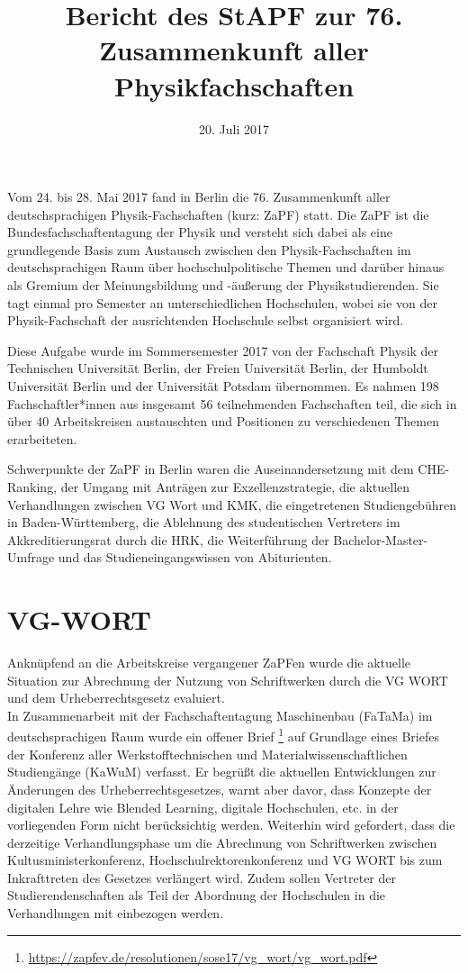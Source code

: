 \documentclass[a4paper]{article}
\begin{document}
	
\title{Bericht des StAPF zur 76. Zusammenkunft aller Physikfachschaften}
\date{20. Juli 2017}

\maketitle

Vom 24. bis 28. Mai 2017 fand in Berlin die 76. Zusammenkunft
aller deutschsprachigen Physik-Fachschaften (kurz: ZaPF) statt.  Die ZaPF ist
die Bundesfachschaftentagung der Physik und versteht sich dabei als eine
grundlegende Basis zum Austausch zwischen den Physik-Fachschaften im
deutschsprachigen Raum über hochschulpolitische Themen und darüber hinaus als
Gremium der Meinungsbildung und -äußerung der Physikstudierenden. Sie tagt
einmal pro Semester an unterschiedlichen Hochschulen, wobei sie von der
Physik-Fachschaft der ausrichtenden Hochschule selbst organisiert wird. 

Diese Aufgabe wurde im Sommersemester 2017 von der Fachschaft Physik der
Technischen Universität Berlin, der Freien Universität Berlin, der Humboldt
Universität Berlin und der Universität Potsdam übernommen.  Es nahmen 198
Fachschaftler*innen aus insgesamt 56 teilnehmenden Fachschaften teil, die sich
in über 40 Arbeitskreisen austauschten und Positionen zu verschiedenen Themen
erarbeiteten.

Schwerpunkte der ZaPF in Berlin waren die Auseinandersetzung mit dem
CHE-Ranking, der Umgang mit Anträgen zur Exzellenzstrategie, die aktuellen
Verhandlungen zwischen VG Wort und KMK, die eingetretenen Studiengebühren in
Baden-Württemberg, die Ablehnung des studentischen Vertreters im
Akkreditierungsrat durch die HRK, die Weiterführung der Bachelor-Master-Umfrage
und das Studieneingangswissen von Abiturienten.

\newpage

\section*{VG-WORT}
Anknüpfend an die Arbeitskreise vergangener ZaPFen wurde die
aktuelle Situation zur Abrechnung der Nutzung von Schriftwerken durch die VG
WORT und dem Urheberrechtsgesetz evaluiert. \\
In Zusammenarbeit mit der Fachschaftentagung Maschinenbau (FaTaMa) im
deutschsprachigen Raum wurde ein offener Brief
\footnote{\href{https://zapfev.de/resolutionen/sose17/vg_wort/vg_wort.pdf}{\url{https://zapfev.de/resolutionen/sose17/vg_wort/vg_wort.pdf}}}
auf Grundlage eines Briefes der Konferenz aller Werkstofftechnischen und
Materialwissenschaftlichen Studiengänge (KaWuM) verfasst. Er begrüßt die
aktuellen Entwicklungen zur Änderungen des Urheberrechtsgesetzes, warnt aber
davor, dass Konzepte der digitalen Lehre wie Blended Learning, digitale
Hochschulen, etc. in der vorliegenden Form nicht berücksichtig werden.
Weiterhin wird gefordert, dass die derzeitige Verhandlungsphase um die
Abrechnung von Schriftwerken zwischen Kultusministerkonferenz,
Hochschulrektorenkonferenz und VG WORT bis zum Inkrafttreten des Gesetzes
verlängert wird. Zudem sollen Vertreter der Studierendenschaften als Teil der
Abordnung der Hochschulen in die Verhandlungen mit einbezogen werden.
\end{document}
